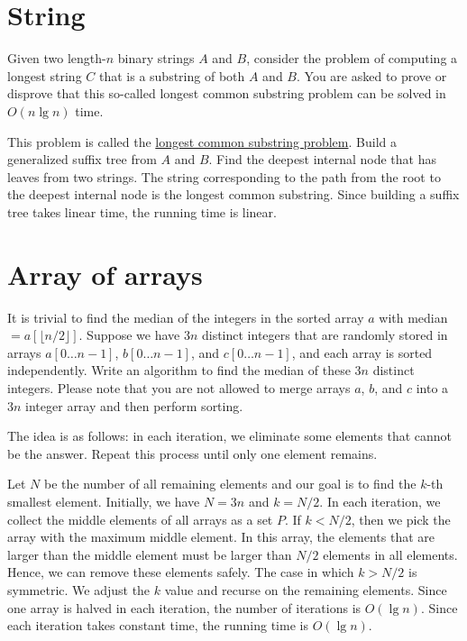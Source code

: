 \section{String}
\begin{Exercise}
Given two length-$n$ binary strings $A$ and $B$, consider the problem of computing a longest string $C$ that is a substring of both $A$ and $B$. You are asked to prove or disprove that this so-called longest common substring problem can be solved in $O(n \lg n)$ time. 
\end{Exercise}
\begin{Answer}
This problem is called the \href{https://en.wikipedia.org/wiki/Longest_common_substring_problem}{longest common substring problem}. Build a generalized suffix tree from $A$ and $B$. Find the deepest internal node that has leaves from two strings. The string corresponding to the path from the root to the deepest internal node is the longest common substring. Since building a suffix tree takes linear time, the running time is linear.
\end{Answer}

\section{Array of arrays}

\begin{Exercise}
It is trivial to find the median of the integers in the sorted array $a$ with median $= a[\lfloor n/2 \rfloor]$. Suppose we have $3n$ distinct integers that are randomly stored in arrays $a[0 \dots n-1]$, $b[0 \dots n-1]$, and $c[0 \dots n-1]$, and each array is sorted independently. Write an algorithm to find the median of these $3n$ distinct integers. Please note that you are not allowed to merge arrays $a$, $b$, and $c$ into a $3n$ integer array and then perform sorting. 
\end{Exercise}
\begin{Answer}
The idea is as follows:  in each iteration, we eliminate some elements that cannot be the answer. Repeat this process until only one element remains.

Let $N$ be the number of all remaining elements and our goal is to find the $k$-th smallest element. Initially, we have $N = 3n$ and $k = N / 2$. In each iteration, we collect the middle elements of all arrays as a set $P$. If $k < N/2$, then we pick the array with the maximum middle element. In this array, the elements that are larger than the middle element must be larger than $N / 2$ elements in all elements. Hence, we can remove these elements safely. The case in which $k > N / 2$ is symmetric. We adjust the $k$ value and recurse on the remaining elements. Since one array is halved in each iteration, the number of iterations is $O(\lg n)$. Since each iteration takes constant time, the running time is $O(\lg n)$.
\end{Answer}

